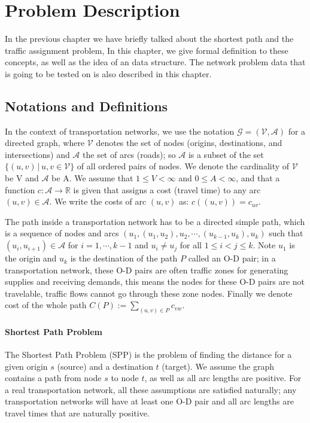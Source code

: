 \chapter{Problem Description}
In the previous chapter we have briefly talked about the
shortest path and the traffic assignment problem,
In this chapter, we give formal definition to these concepts,
as well as the idea of an data structure.
The network problem data that is going to be tested on is also 
described in this chapter.
\section{Notations and Definitions}

In the context of transportation networks,
we use the notation $ \mathcal{G} = ( \mathcal{V}, \mathcal{A} ) $ for a directed graph,
where $ \mathcal{V} $ denotes the set of nodes (origins, destinations, and intersections)
and $ \mathcal{A} $ the set of arcs (roads);
so $ \mathcal{A} $ is a subset of the set $ \{ (u, v)\, | \, u, v \in \mathcal{V} \} $ of all ordered pairs of nodes.
We denote the cardinality of $ \mathcal{V} $ be V and $ \mathcal{A} $ be A.
We assume that $ 1 \leq V < \infty $ and $ 0 \leq A < \infty $,
and that a function $ c : \mathcal{A} \rightarrow \mathbb{R} $ is given that assigns a cost (travel time) to any arc $ (u,v) \in \mathcal{A} $.
We write the costs of arc $(u, v)$ as: $ c((u, v)) = c_{uv} $.

The path inside a transportation network has to be a directed simple path, 
which is a sequence of nodes and arcs $ (u_1, (u_1, u_2), u_2, \cdots , (u_{k-1}, u_k), u_k ) $
such that $ (u_i, u_{i+1}) \in \mathcal{A}$ for $i = 1,\cdots,k-1$ and $u_i \neq u_j$ for all $ 1 \leq i < j \leq k$.
Note $u_1$ is the origin and $u_k$ is the destination of the path $P$ called an O-D pair;
in a transportation network,
these O-D pairs are often traffic zones for generating supplies and receiving demands,
this means the nodes for these O-D pairs are not travelable,
traffic flows cannot go through these zone nodes.
Finally we denote cost of the whole path $C(P) := \sum_{(u,v)\in P} c_{vw}$.

\subsubsection{Shortest Path Problem}
The Shortest Path Problem (SPP) is the problem of finding the distance for a given origin $s$ (source) and a destination $t$ (target).
We assume the graph contains a path from node $s$  to node $t$, as well as all arc lengths are positive.
For a real transportation network, all these assumptions are satisfied naturally; any transportation networks will have at least one O-D pair and
all arc lengths are travel times that are naturally positive.

